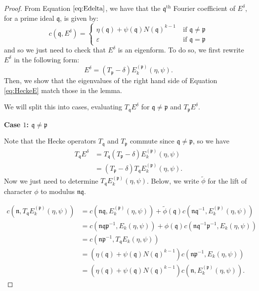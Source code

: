 \documentclass[10pt,a4paper]{amsart}
\begin{document}
\begin{proof}
From Equation $\eqref{eq:Edelta}$, we have that the $\mathfrak{q}^{\text{th}}$ Fourier coefficient of $E^\delta$, for a prime ideal $\mathfrak{q}$, is given by:
\begin{equation}
    c(\mathfrak{q}, E^\delta) = \begin{cases}
    \eta(\mathfrak{q})+\psi(\mathfrak{q})N(\mathfrak{q})^{k-1}\ &\text{if } \mathfrak{q} \neq \mathfrak{p} \\
            \varepsilon \ &\text{if } \mathfrak{q} = \mathfrak{p}
    \end{cases}
\end{equation}
    and so we just need to check that $E^\delta$ is an eigenform. To do so, we first rewrite $E^\delta$ in the following form:
    \begin{equation}
    \label{eq:HeckeE}
        E^\delta = (T_\mathfrak{p} - \delta)E^{(\mathfrak{p})}_k(\eta, \psi).
    \end{equation}
    Then, we show that the eigenvalues of the right hand side of Equation \eqref{eq:HeckeE} match those in the lemma.

    We will split this into cases, evaluating $T_\mathfrak{q}E^\delta$ for $\mathfrak{q} \neq \mathfrak{p}$ and $T_\mathfrak{p}E^\delta$. 

    \vspace{0.2in}
    \textbf{Case $1$: $\mathfrak{q} \neq \mathfrak{p}$}
    
    \vspace{0.1in}
    Note that the Hecke operators $T_\mathfrak{q}$ and $T_\mathfrak{p}$ commute since $\mathfrak{q} \neq \mathfrak{p}$, so we have 
    \begin{align*}
        T_\mathfrak{q}E^\delta &= T_\mathfrak{q}(T_\mathfrak{p} - \delta)E^{(\mathfrak{p})}_k(\eta, \psi) \\
        &= (T_\mathfrak{p} - \delta)T_\mathfrak{q}E^{(\mathfrak{p})}_k(\eta, \psi).
    \end{align*}
     Now we just need to determine $T_\mathfrak{q}E^{(\mathfrak{p})}_k(\eta, \psi)$. Below, we write $\tilde{\phi}$ for the lift of character $\phi$ to modulus $\mathfrak{nq}$.

     \begin{align*}
     c(\mathfrak{n},T_\mathfrak{q}E^{(\mathfrak{p})}_k(\eta, \psi)) &= c(\mathfrak{nq}, E^{(\mathfrak{p})}_k(\eta, \psi)) + \tilde{\phi}(\mathfrak{q})c(\mathfrak{nq}^{-1}, E^{(\mathfrak{p})}_k(\eta, \psi)) \\
         &= c(\mathfrak{nqp}^{-1}, E_k(\eta,\psi)) + \phi(\mathfrak{q})c(\mathfrak{nq}^{-1}\mathfrak{p}^{-1}, E_k(\eta, \psi)) \\
         &= c(\mathfrak{np}^{-1}, T_\mathfrak{q}E_k(\eta,\psi)) \\
         &= (\eta(\mathfrak{q})+\psi(\mathfrak{q})N(\mathfrak{q})^{k-1})c(\mathfrak{np}^{-1}, E_k(\eta,\psi)) \\
         &=(\eta(\mathfrak{q})+\psi(\mathfrak{q})N(\mathfrak{q})^{k-1})c(\mathfrak{n}, E_k^{(\mathfrak{p})}(\eta,\psi)).
    \end{align*}


\end{proof}
\end{document}
